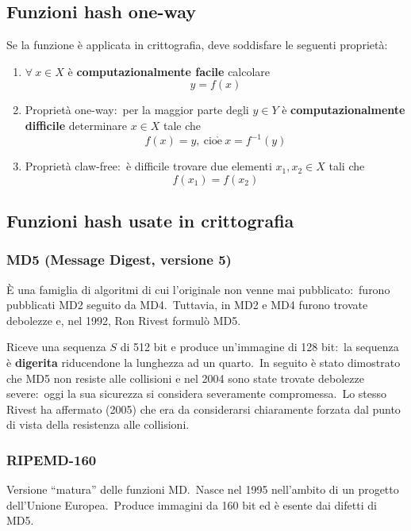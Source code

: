 \subsection{Funzioni hash one-way}

Se la funzione è applicata in crittografia, deve soddisfare le seguenti proprietà:
\begin{enumerate}
    \item $\forall\ x \in X$ è \textbf{computazionalmente facile} calcolare
          \[y = f(x)\]
    \item Proprietà one-way:\ per la maggior parte degli $y \in Y$ è \textbf{computazionalmente difficile} determinare $x \in X$ tale che
          \[f(x) = y,\ \mathrm{cio\grave{e}}\ x = f^{-1}(y)\]
    \item Proprietà claw-free:\ è difficile trovare due elementi $x_1, x_2 \in X$ tali che
          \[f(x_1) = f(x_2)\]
\end{enumerate}

\subsection{Funzioni hash usate in crittografia}

\subsubsection{MD5 (Message Digest, versione 5)}

È una famiglia di algoritmi di cui l'originale non venne mai pubblicato:\ furono pubblicati MD2 seguito da MD4.\
Tuttavia, in MD2 e MD4 furono trovate debolezze e, nel 1992, Ron Rivest formulò MD5.\

Riceve una sequenza $S$ di 512 bit e produce un'immagine di 128 bit:\ la sequenza è \textbf{digerita} riducendone la lunghezza ad un quarto.\
In seguito è stato dimostrato che MD5 non resiste alle collisioni e nel 2004 sono state trovate debolezze severe:\ oggi la sua sicurezza si considera severamente compromessa.\
Lo stesso Rivest ha affermato (2005) che era da considerarsi chiaramente forzata dal punto di vista della resistenza alle collisioni.\

\subsubsection{RIPEMD-160}

Versione ``matura'' delle funzioni MD.\
Nasce nel 1995 nell'ambito di un progetto dell'Unione Europea.\
Produce immagini da 160 bit ed è esente dai difetti di MD5.

